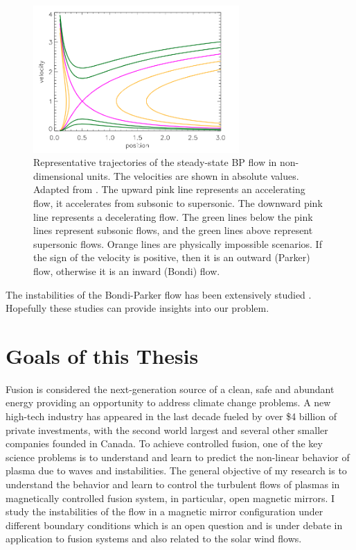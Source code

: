 \begin{figure}[htbp]
	\centering
	\includegraphics[width=0.7\textwidth]{figures/steady-state-BP-flow}
	\caption{Representative trajectories of the steady-state BP flow in non-dimensional units. The velocities are shown in absolute values. Adapted from \cite{keto_stability_2020}. The upward pink line represents an accelerating flow, it accelerates from subsonic to supersonic. The downward pink line represents a decelerating flow. The green lines below the pink lines represent subsonic flows, and the green lines above represent supersonic flows. Orange lines are physically impossible scenarios. If the sign of the velocity is positive, then it is an outward (Parker) flow, otherwise it is an inward (Bondi) flow.}
	\label{fig:BP-flow-velocity}
\end{figure}

The instabilities of the Bondi-Parker flow has been extensively studied \cite{bondi_spherically_1952,velli_from_1994,velli_hydrodynamics_2001,del_dynamical_1998,keto_stability_2020}. Hopefully these studies can provide insights into our problem.

\section{Goals of this Thesis}
Fusion is considered the next-generation source of a clean, safe and abundant energy providing an opportunity to address climate change problems. A new high-tech industry has appeared in the last decade fueled by over \$4 billion of private investments, with the second world largest and several other smaller companies founded in Canada. To achieve controlled fusion, one of the key science problems is to understand and learn to predict the non-linear behavior of plasma due to waves and instabilities. The general objective of my research is to understand the behavior and learn to control the turbulent flows of plasmas in magnetically controlled fusion system, in particular, open magnetic mirrors. I study the instabilities of the flow in a magnetic mirror configuration under different boundary conditions which is an open question and is under debate in application to fusion systems and also related to the solar wind flows.

